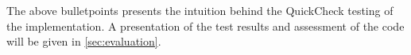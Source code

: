 The above bulletpoints presents the intuition behind the QuickCheck testing of the implementation. A presentation of the test results and assessment of the code will be given in \autoref{sec:evaluation}.























